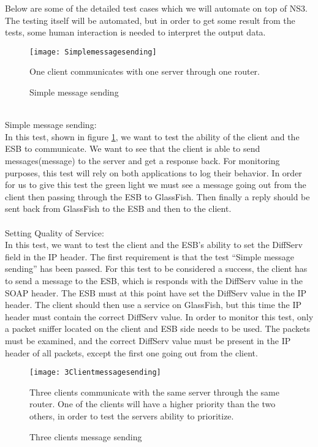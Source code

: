     Below are some of the detailed test cases which we will automate on top of NS3. The testing itself will be automated, but in order to get some result from the tests, some human interaction is needed to interpret the output data.
\\
    \begin{figure}[h]
        \centering
        \texttt{[image: Simplemessagesending]}
        \caption{Simple message sending}
        One client communicates with one server through one router.
        \label{fig:Simple message sending}
    \end{figure}
\\
Simple message sending:\\
    In this test, shown in figure \ref{fig:Simple message sending}, we want to test the ability of the client and the ESB to communicate. We want to see that the client is able to send messages(\gls{message}) to the server and get a response back. For monitoring purposes, this test will rely on both applications to log their behavior. In order for us to give this test the green light we must see a message going out from the client then passing through the ESB to GlassFish. Then finally a reply should be sent back from GlassFish to the ESB and then to the client.
\\\\
Setting Quality of Service:\\
    In this test, we want to test the client and the ESB’s ability to set the DiffServ field in the IP header. The first requirement is that the test “Simple message sending” has been passed. For this test to be considered a success, the client has to send a message to the ESB, which is responds with the DiffServ value in the SOAP header. The ESB must at this point have set the DiffServ value in the IP header. The client should then use a service on GlassFish, but this time the IP header must contain the correct DiffServ value. In order to monitor this test, only a packet sniffer located on the client and ESB side needs to be used. The packets must be examined, and the correct DiffServ value must be present in the IP header of all packets, except the first one going out from the client.
\\
    \begin{figure}[h]
        \centering
        \texttt{[image: 3Clientmessagesending]}
        \caption{Three clients message sending}
	Three clients communicate with the same server through the same router. One of the clients will have a higher priority than the two others, in order to test the servers ability to prioritize.
        \label{fig:threeclientmessagesending}
    \end{figure}
